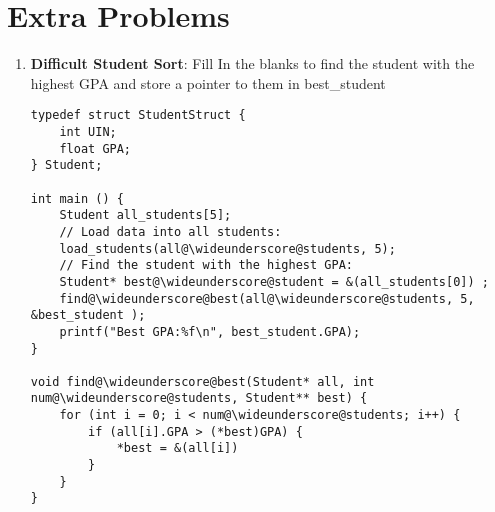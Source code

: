 \documentclass{article}
\begin{document}
\section{Extra Problems}
\begin{enumerate}[label=(\alph*)]
\item \textbf{Difficult Student Sort}: Fill In the blanks to find the student with the highest GPA and store a pointer to them in best\_student
\begin{lstlisting}[style=CStyle] 
typedef struct StudentStruct {
    int UIN;
    float GPA;
} Student;

int main () {
    Student all_students[5];
    // Load data into all students:
    load_students(all@\wideunderscore@students, 5);
    // Find the student with the highest GPA:
    Student* best@\wideunderscore@student = &(all_students[0]) ;
    find@\wideunderscore@best(all@\wideunderscore@students, 5, &best_student );
    printf("Best GPA:%f\n", best_student.GPA);
}

void find@\wideunderscore@best(Student* all, int num@\wideunderscore@students, Student** best) {
    for (int i = 0; i < num@\wideunderscore@students; i++) {
        if (all[i].GPA > (*best)GPA) {
            *best = &(all[i])
        }
    }
}

\end{lstlisting}
\begin{lstlisting}[style=CStyle]
\end{lstlisting}


\end{enumerate}
\end{document}
